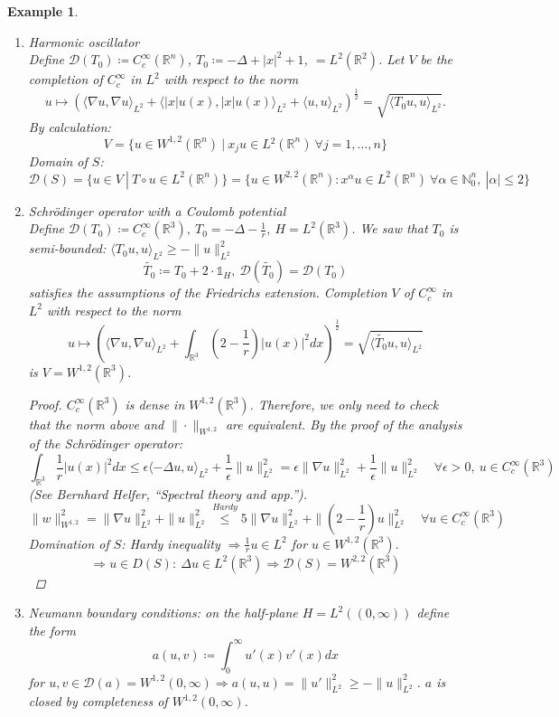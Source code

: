 \documentclass[12pt]{extreport} %
\newcommand{\N}{\mathbb{N}}
\newcommand{\R}{\mathbb{R}}
\newcommand{\DO}[1]{\mathcal{D}\left( {#1} \right)}
\theoremstyle{named}
\theoremstyle{nnamed}
\theoremstyle{itshape}
\theoremstyle{normal}
\newtheorem*{example}{Example}
\begin{document}
\begin{example} ~\
	\begin{enumerate} 
		\item Harmonic oscillator ~\\
			Define $\DO{T_0} \coloneq C_c^\infty(\R^n)$, $T_0 \coloneqq -\Delta + |x|^2 + 1$, $ = L^2(\R^2)$. Let $V$ be the completion of $C_c^\infty$ in $L^2$ with respect to the norm
			$$ u \mapsto \left( \langle \nabla u, \nabla u \rangle_{L^2} + \langle |x|u(x), |x|u(x)\rangle_{L^2} + \langle u, u \rangle_{L^2} \right)^{\frac{1}{2}} = \sqrt{\langle T_0 u, u \rangle_{L^2}}. $$
			By calculation:
			$$ V = \big\{ u \in W^{1,2}(\R^n) ~|~x_j u \in L{^2}(\R^n) ~\forall j = 1, \dotsc, n \big\} $$
			Domain of $S$:
			$$ \DO{S} = \big\{ u \in V ~|~ T \circ u \in L^2(\R^n) \big\} = \big\{ u \in W^{2,2}(\R^n) \colon x^{\alpha} u \in L^2(\R^n) ~\forall \alpha \in \N_0^n, ~|\alpha| \leq 2 \big\} $$
		\item Schrödinger operator with a Coulomb potential ~\\
			Define $\DO{T_{0}} \coloneqq C_c^\infty(\R^3), ~ T_0 = - \Delta - \frac{1}{r}, ~ H = L^2(\R^3)$. We saw that $T_0$ is semi-bounded: $\langle T_0 u, u \rangle_{L^2} \geq - \| u \|_{L^2}^2$
			$$\tilde{T_0} \coloneqq T_0 + 2 \cdot \mathds{1}_H, ~ \DO{\tilde{T_0}} = \DO{T_0}$$ 
			satisfies the assumptions of the Friedrichs extension. Completion $V$ of $C_c^{\infty}$ in $L^2$ with respect to the norm %
			$$ u \mapsto \left( \langle \nabla u, \nabla u \rangle_{L^2} + \int_{\R^3} \left( 2 - \frac{1}{r} \right) |u(x)|^2 dx \right)^\frac{1}{2} = \sqrt{ \langle \tilde{T_0} u, u \rangle_{L^2}} $$
			is $V = W^{1,2}(\R^3)$.
			
			\begin{proof}
				$C_c^\infty(\R^3)$ is dense in $W^{1,2}(\R^3)$. Therefore, we only need to check that the norm above and $\| \cdot \|_{W^{1,2}}$ are equivalent. By the proof of the analysis of the Schrödinger operator:
				$$ \int_{\R^3} \frac{1}{r} |u(x)|^2 dx \leq \epsilon \langle - \Delta u, u \rangle_{L^2} + \frac{1}{\epsilon} \| u \|_{L^2}^2 = \epsilon \| \nabla u \|_{L^2}^2 + \frac{1}{\epsilon} \| u \|^2_{L^2} \quad \forall \epsilon > 0, ~u \in C_c^\infty(\R^3) $$
				(See Bernhard Helfer, \enquote{Spectral theory and app.}).
				$$ \| w \|_{W^{1,2}}^2 = \| \nabla u \|_{L^2}^2 + \| u \|_{L^2}^2 \overset{Hardy}{\leq} 5 \| \nabla u \|^2_{L^2} + \| \left( 2 - \frac{1}{r} \right) u \|^2_{L^2} \quad \forall u \in C_c^\infty(\R^3) $$
				Domination of $S$: Hardy inequality $\Rightarrow \frac{1}{r} u \in L^2$ for $u \in W^{1,2}(\R^3)$.
				$$ \Rightarrow u \in D(S): ~ \Delta u \in L^2(\R^3) \Rightarrow \DO{S} = W^{2,2}(\R^3) $$
			\end{proof}
		\item Neumann boundary conditions: on the half-plane $H = L^2\left( (0, \infty) \right)$ define the form
			$$ a(u, v) \coloneqq \int_{0}^{\infty} u'(x) v'(x) dx  $$
			for $u,v \in \DO{a} = W^{1,2}(0, \infty) \Rightarrow a(u,u) = \|u'\|_{L^2}^2 \geq - \| u \|_{L^2}^2$. $a$ is closed by completeness of $W^{1,2}(0, \infty)$. ~\\
			

\end{enumerate}
\end{example}
\end{document}
